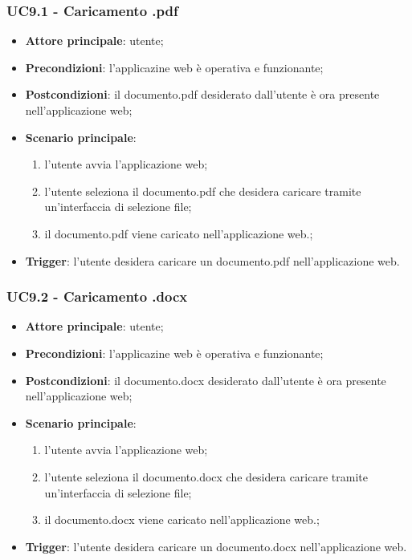 \documentclass[10pt, a4paper]{article}
\begin{document}
    \subsubsection{UC9.1 - Caricamento .pdf}
    \begin{itemize}
        \item \textbf{Attore principale}: utente;
        \item \textbf{Precondizioni}: l'applicazine web è operativa e funzionante;
        \item \textbf{Postcondizioni}: il documento.pdf desiderato dall'utente è ora presente nell'applicazione web;
        \item \textbf{Scenario principale}:
            \begin{enumerate}
                \item l'utente avvia l'applicazione web;
                \item l'utente seleziona il documento.pdf che desidera caricare tramite un'interfaccia di selezione file;
                \item il documento.pdf viene caricato nell'applicazione web.;
            \end{enumerate}
        \item \textbf{Trigger}: l'utente desidera caricare un documento.pdf nell'applicazione web.
    \end{itemize}

    \subsubsection{UC9.2 - Caricamento .docx}
    \begin{itemize}
        \item \textbf{Attore principale}: utente;
        \item \textbf{Precondizioni}: l'applicazine web è operativa e funzionante;
        \item \textbf{Postcondizioni}: il documento.docx desiderato dall'utente è ora presente nell'applicazione web;
        \item \textbf{Scenario principale}:
            \begin{enumerate}
                \item l'utente avvia l'applicazione web;
                \item l'utente seleziona il documento.docx che desidera caricare tramite un'interfaccia di selezione file;
                \item il documento.docx viene caricato nell'applicazione web.;
            \end{enumerate}
        \item \textbf{Trigger}: l'utente desidera caricare un documento.docx nell'applicazione web.
    \end{itemize}
\end{document}

